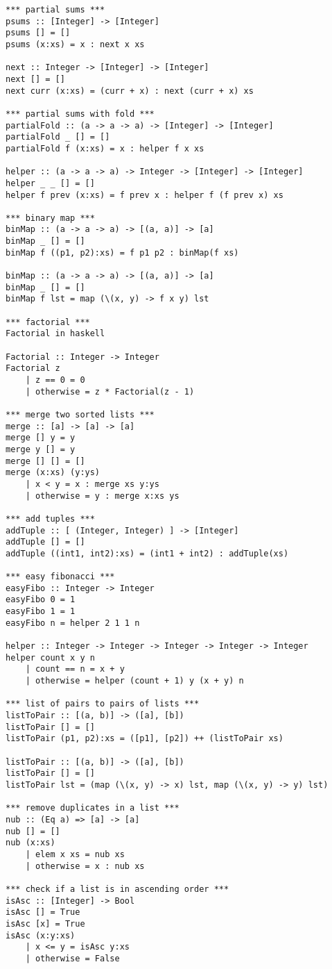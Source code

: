 \documentclass{article}
\begin{document}
    \begin{verbatim}
*** partial sums ***
psums :: [Integer] -> [Integer]
psums [] = []
psums (x:xs) = x : next x xs

next :: Integer -> [Integer] -> [Integer]
next [] = []
next curr (x:xs) = (curr + x) : next (curr + x) xs

*** partial sums with fold ***
partialFold :: (a -> a -> a) -> [Integer] -> [Integer]
partialFold _ [] = []
partialFold f (x:xs) = x : helper f x xs

helper :: (a -> a -> a) -> Integer -> [Integer] -> [Integer]
helper _ _ [] = []
helper f prev (x:xs) = f prev x : helper f (f prev x) xs

*** binary map ***
binMap :: (a -> a -> a) -> [(a, a)] -> [a]
binMap _ [] = []
binMap f ((p1, p2):xs) = f p1 p2 : binMap(f xs)

binMap :: (a -> a -> a) -> [(a, a)] -> [a]
binMap _ [] = []
binMap f lst = map (\(x, y) -> f x y) lst

*** factorial ***
Factorial in haskell

Factorial :: Integer -> Integer
Factorial z
    | z == 0 = 0
    | otherwise = z * Factorial(z - 1)

*** merge two sorted lists ***
merge :: [a] -> [a] -> [a]
merge [] y = y
merge y [] = y
merge [] [] = []
merge (x:xs) (y:ys)
    | x < y = x : merge xs y:ys
    | otherwise = y : merge x:xs ys

*** add tuples ***
addTuple :: [ (Integer, Integer) ] -> [Integer]
addTuple [] = []
addTuple ((int1, int2):xs) = (int1 + int2) : addTuple(xs)

*** easy fibonacci ***
easyFibo :: Integer -> Integer
easyFibo 0 = 1
easyFibo 1 = 1
easyFibo n = helper 2 1 1 n

helper :: Integer -> Integer -> Integer -> Integer -> Integer
helper count x y n
    | count == n = x + y
    | otherwise = helper (count + 1) y (x + y) n

*** list of pairs to pairs of lists ***
listToPair :: [(a, b)] -> ([a], [b])
listToPair [] = []
listToPair (p1, p2):xs = ([p1], [p2]) ++ (listToPair xs)

listToPair :: [(a, b)] -> ([a], [b])
listToPair [] = []
listToPair lst = (map (\(x, y) -> x) lst, map (\(x, y) -> y) lst)

*** remove duplicates in a list ***
nub :: (Eq a) => [a] -> [a]
nub [] = []
nub (x:xs)
    | elem x xs = nub xs
    | otherwise = x : nub xs

*** check if a list is in ascending order ***
isAsc :: [Integer] -> Bool
isAsc [] = True
isAsc [x] = True
isAsc (x:y:xs)
    | x <= y = isAsc y:xs
    | otherwise = False


\end{verbatim}
\end{document}
